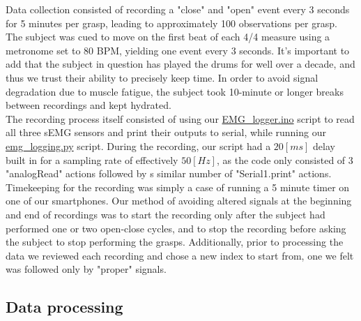 \documentclass[10pt]{article}
\begin{document}
Data collection consisted of recording a "close" and "open" event every 3 seconds for 5 minutes per grasp, leading to approximately 100 observations per grasp. The subject was cued to move on the first beat of each 4/4 measure using a metronome set to 80 BPM, yielding one event every 3 seconds. It's important to add that the subject in question has played the drums for well over a decade, and thus we trust their ability to precisely keep time. In order to avoid signal degradation due to muscle fatigue, the subject took 10-minute or longer breaks between recordings and kept hydrated.\\
The recording process itself consisted of using our \href{https://github.com/eladsimantov/Wearable-Robotics/blob/main/Final%20Project/EMG_logger.ino}{EMG\_logger.ino} script to read all three sEMG sensors and print their outputs to serial, while running our \href{https://github.com/eladsimantov/Wearable-Robotics/blob/main/Final%20Project/emg_logging.py}{emg\_logging.py} script. During the recording, our script had a $20[ms]$ delay built in for a sampling rate of effectively $50[Hz]$, as the code only consisted of 3 "analogRead" actions followed by s similar number of "Serial1.print" actions.\\
Timekeeping for the recording was simply a case of running a 5 minute timer on one of our smartphones. Our method of avoiding altered signals at the beginning and end of recordings was to start the recording only after the subject had performed one or two open-close cycles, and to stop the recording before asking the subject to stop performing the grasps. Additionally, prior to processing the data we reviewed each recording and chose a new index to start from, one we felt was followed only by "proper" signals.

\subsection{Data processing}
\end{document}
